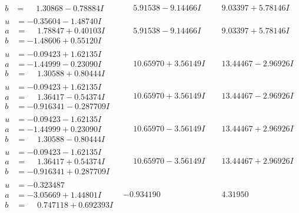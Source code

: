 \documentclass[1p]{elsarticle_modified}
\theoremstyle{definition}
\begin{document}
$$\begin{array}{c|c|c}
\begin{aligned}
b &= \phantom{-}1.30868 - 0.78884 I\end{aligned}
 & \phantom{-}5.91538 - 9.14466 I & \phantom{-}9.03397 + 5.78146 I \\ \hline\begin{aligned}
u &= -0.35604 - 1.48740 I \\
a &= \phantom{-}1.78847 + 0.40103 I \\
b &= -1.48606 + 0.55120 I\end{aligned}
 & \phantom{-}5.91538 - 9.14466 I & \phantom{-}9.03397 + 5.78146 I \\ \hline\begin{aligned}
u &= -0.09423 + 1.62135 I \\
a &= -1.44999 - 0.23090 I \\
b &= \phantom{-}1.30588 + 0.80444 I\end{aligned}
 & \phantom{-}10.65970 + 3.56149 I & \phantom{-}13.44467 - 2.96926 I \\ \hline\begin{aligned}
u &= -0.09423 + 1.62135 I \\
a &= \phantom{-}1.36417 - 0.54374 I \\
b &= -0.916341 - 0.287709 I\end{aligned}
 & \phantom{-}10.65970 + 3.56149 I & \phantom{-}13.44467 - 2.96926 I \\ \hline\begin{aligned}
u &= -0.09423 - 1.62135 I \\
a &= -1.44999 + 0.23090 I \\
b &= \phantom{-}1.30588 - 0.80444 I\end{aligned}
 & \phantom{-}10.65970 - 3.56149 I & \phantom{-}13.44467 + 2.96926 I \\ \hline\begin{aligned}
u &= -0.09423 - 1.62135 I \\
a &= \phantom{-}1.36417 + 0.54374 I \\
b &= -0.916341 + 0.287709 I\end{aligned}
 & \phantom{-}10.65970 - 3.56149 I & \phantom{-}13.44467 + 2.96926 I \\ \hline\begin{aligned}
u &= -0.323487\phantom{ +0.000000I} \\
a &= -3.05669 + 1.44801 I \\
b &= \phantom{-}0.747118 + 0.692393 I\end{aligned}
 & -0.934190\phantom{ +0.000000I} & \phantom{-}4.31950\phantom{ +0.000000I} \\ \hline\begin{aligned}

\end{aligned}
\end{array}$$
\end{document}

